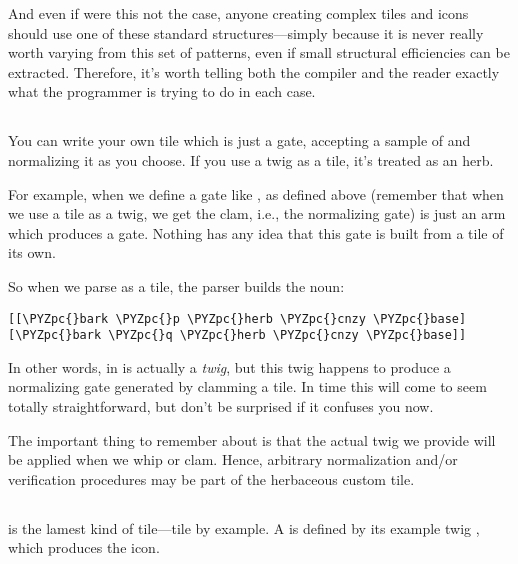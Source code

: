 And even if were this not the case, anyone creating complex tiles
and icons should use one of these standard structures---simply
because it is never really worth varying from this set of
patterns, even if small structural efficiencies can be extracted.
Therefore, it's worth telling both the compiler and the reader
exactly what the programmer is trying to do in each case.

\subsection{\kode{[\%herb p=twig]}}

You can write your own tile which is just a gate, accepting a
sample of \kode{*} and normalizing it as you choose.  If you use a
twig as a tile, it's treated as an herb.

For example, when we define a gate like , as defined
above (remember that when we use a tile as a twig, we get the
clam, i.e., the normalizing gate)  is just an arm which
produces a gate.  Nothing has any idea that this gate is built
from a tile of its own.

So when we parse \kode{[p=base q=base]} as a tile, the parser builds
the noun:

\begin{framed_shaded}
\begin{Verbatim}[fontsize=\relsize{-2.5},fontseries=b,commandchars=\\\{\}]
[[\PYZpc{}bark \PYZpc{}p \PYZpc{}herb \PYZpc{}cnzy \PYZpc{}base] [\PYZpc{}bark \PYZpc{}q \PYZpc{}herb \PYZpc{}cnzy \PYZpc{}base]]
\end{Verbatim}
\end{framed_shaded}
In other words,  in  is actually a \emph{twig}, but this
twig happens to produce a normalizing gate generated by clamming
a tile.  In time this will come to seem totally straightforward,
but don't be surprised if it confuses you now.

The important thing to remember about  is that the actual
twig we provide will be applied when we whip or clam.  Hence,
arbitrary normalization and/or verification procedures may be
part of the herbaceous custom tile.

\subsection{\kode{[\%weed p=twig]}}

 is the lamest kind of tile---tile by example.  A 
is defined by its example twig , which produces the icon.

